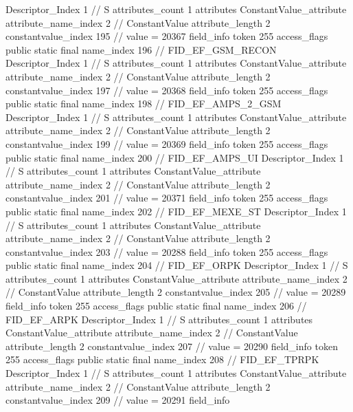 {{{{{				Descriptor_Index	1		// S
				attributes_count	1
				attributes {
				ConstantValue_attribute {
					attribute_name_index	2		// ConstantValue
					attribute_length	2
					constantvalue_index	195		// value = 20367
				}
				}
			}
			field_info {
				token	255
				access_flags	public static final
				name_index	196		// FID_EF_GSM_RECON
				Descriptor_Index	1		// S
				attributes_count	1
				attributes {
				ConstantValue_attribute {
					attribute_name_index	2		// ConstantValue
					attribute_length	2
					constantvalue_index	197		// value = 20368
				}
				}
			}
			field_info {
				token	255
				access_flags	public static final
				name_index	198		// FID_EF_AMPS_2_GSM
				Descriptor_Index	1		// S
				attributes_count	1
				attributes {
				ConstantValue_attribute {
					attribute_name_index	2		// ConstantValue
					attribute_length	2
					constantvalue_index	199		// value = 20369
				}
				}
			}
			field_info {
				token	255
				access_flags	public static final
				name_index	200		// FID_EF_AMPS_UI
				Descriptor_Index	1		// S
				attributes_count	1
				attributes {
				ConstantValue_attribute {
					attribute_name_index	2		// ConstantValue
					attribute_length	2
					constantvalue_index	201		// value = 20371
				}
				}
			}
			field_info {
				token	255
				access_flags	public static final
				name_index	202		// FID_EF_MEXE_ST
				Descriptor_Index	1		// S
				attributes_count	1
				attributes {
				ConstantValue_attribute {
					attribute_name_index	2		// ConstantValue
					attribute_length	2
					constantvalue_index	203		// value = 20288
				}
				}
			}
			field_info {
				token	255
				access_flags	public static final
				name_index	204		// FID_EF_ORPK
				Descriptor_Index	1		// S
				attributes_count	1
				attributes {
				ConstantValue_attribute {
					attribute_name_index	2		// ConstantValue
					attribute_length	2
					constantvalue_index	205		// value = 20289
				}
				}
			}
			field_info {
				token	255
				access_flags	public static final
				name_index	206		// FID_EF_ARPK
				Descriptor_Index	1		// S
				attributes_count	1
				attributes {
				ConstantValue_attribute {
					attribute_name_index	2		// ConstantValue
					attribute_length	2
					constantvalue_index	207		// value = 20290
				}
				}
			}
			field_info {
				token	255
				access_flags	public static final
				name_index	208		// FID_EF_TPRPK
				Descriptor_Index	1		// S
				attributes_count	1
				attributes {
				ConstantValue_attribute {
					attribute_name_index	2		// ConstantValue
					attribute_length	2
					constantvalue_index	209		// value = 20291
				}
				}
			}
			field_info {
}}}}}
